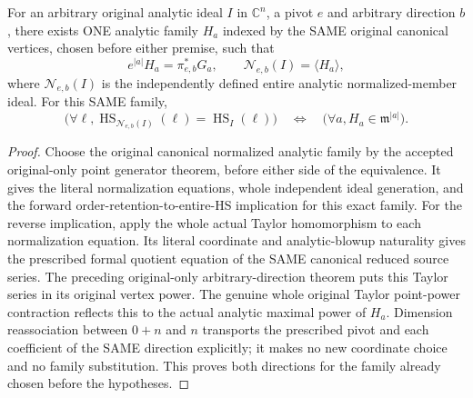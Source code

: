 \begin{theorem}
\label{hir:actual-original-arbitrary-point-hs-iff-orders-same-family}
\leanok
For an arbitrary original analytic ideal $I$ in $\mathbb C^n$, a pivot
$e$ and arbitrary direction $b$, there exists ONE analytic family $H_a$
indexed by the SAME original canonical vertices, chosen before either
premise, such that
\[
 e^{|a|}H_a=\pi_{e,b}^*G_a,\qquad
 \mathcal N_{e,b}(I)=\langle H_a\rangle,
\]
where $\mathcal N_{e,b}(I)$ is the independently defined entire analytic
normalized-member ideal. For this SAME family,
\[
 \bigl(\forall\ell,\operatorname{HS}_{\mathcal N_{e,b}(I)}(\ell)
        =\operatorname{HS}_I(\ell)\bigr)
 \quad\Longleftrightarrow\quad
 \bigl(\forall a,H_a\in\mathfrak m^{|a|}\bigr).
\]
\end{theorem}
\begin{proof}
Choose the original canonical normalized analytic family by the accepted
original-only point generator theorem, before either side of the
equivalence. It gives the literal normalization equations, whole
independent ideal generation, and the forward order-retention-to-entire-HS
implication for this exact family. For the reverse implication, apply the
whole actual Taylor homomorphism to each normalization equation. Its
literal coordinate and analytic-blowup naturality gives the prescribed
formal quotient equation of the SAME canonical reduced source series.
The preceding original-only arbitrary-direction theorem puts this Taylor
series in its original vertex power. The genuine whole original Taylor
point-power contraction reflects this to the actual analytic maximal
power of $H_a$. Dimension reassociation between $0+n$ and $n$ transports
the prescribed pivot and each coefficient of the SAME direction explicitly;
it makes no new coordinate choice and no family substitution. This proves
both directions for the family already chosen before the hypotheses.
\end{proof}
